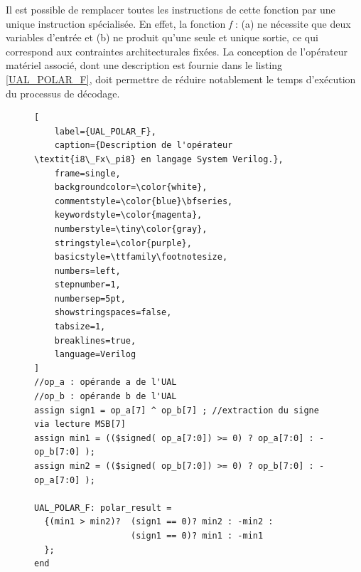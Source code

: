 \documentclass[../main.tex]{subfiles}
\begin{document}
Il est possible de remplacer toutes les instructions de cette fonction par une unique instruction spécialisée. En effet, la fonction \textit{f} : (a) ne nécessite que deux variables d'entrée et (b) ne produit qu'une seule et unique sortie, ce qui correspond aux contraintes architecturales fixées. La conception de l'opérateur matériel associé, dont une description est fournie dans le listing \ref{UAL_POLAR_F}, doit permettre de réduire notablement le temps d'exécution du processus de décodage.

\begin{figure}[!tb]
\begin{lstlisting}[
    label={UAL_POLAR_F},
    caption={Description de l'opérateur \textit{i8\_Fx\_pi8} en langage System Verilog.},
    frame=single,
    backgroundcolor=\color{white},  
    commentstyle=\color{blue}\bfseries,
    keywordstyle=\color{magenta},
    numberstyle=\tiny\color{gray},
    stringstyle=\color{purple},
    basicstyle=\ttfamily\footnotesize,
    numbers=left,
    stepnumber=1,
    numbersep=5pt,                 
    showstringspaces=false,
    tabsize=1,
    breaklines=true,
    language=Verilog
]
//op_a : opérande a de l'UAL 
//op_b : opérande b de l'UAL
assign sign1 = op_a[7] ^ op_b[7] ; //extraction du signe via lecture MSB[7]
assign min1 = (($signed( op_a[7:0]) >= 0) ? op_a[7:0] : -op_b[7:0] );
assign min2 = (($signed( op_b[7:0]) >= 0) ? op_b[7:0] : -op_a[7:0] );

UAL_POLAR_F: polar_result = 
  {(min1 > min2)?  (sign1 == 0)? min2 : -min2 : 
                   (sign1 == 0)? min1 : -min1
  };
end
\end{lstlisting}
\end{figure}
\end{document}
